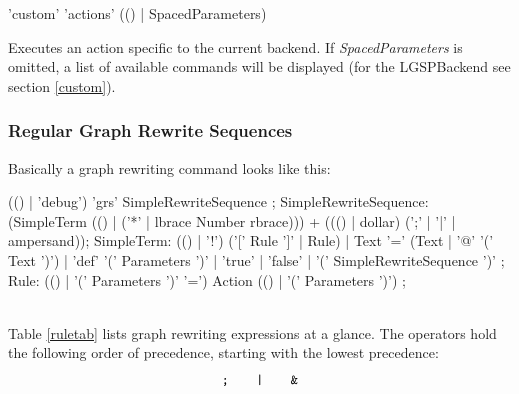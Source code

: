 \begin{rail}
  'custom' 'actions' (() | SpacedParameters)
\end{rail}
Executes an action specific to the current backend. If \emph{SpacedParameters} is omitted, a list of available commands will be displayed (for the LGSPBackend see section \ref{custom}).

\subsubsection*{Regular Graph Rewrite Sequences}
Basically a graph rewriting command looks like this:
\makeatletter
\begin{rail}
  (() | 'debug') 'grs' SimpleRewriteSequence ;
  SimpleRewriteSequence: (SimpleTerm (() | ('*' | lbrace Number rbrace))) + ((() | dollar) (';' | '|' | ampersand));
  SimpleTerm: (() | '!') ('[' Rule ']' | Rule) |
    Text '=' (Text | '@' '(' Text ')') |
    'def' '(' Parameters ')' |
    'true' |
    'false' |
    '(' SimpleRewriteSequence ')' ;
  Rule: (() | '(' Parameters ')' '=') Action (() | '(' Parameters ')') ;
\end{rail}
\makeatother
\mbox{\quad}\\
Table \ref{ruletab} lists graph rewriting expressions at a glance. The operators hold the following order of precedence, starting with the lowest precedence: 
\[ \text{\texttt{;}} \;\;\;\;\;\;\; \text{\texttt{|}} \;\;\;\;\;\;\;  \text{\texttt{\&}}\] 
\makeatletter
